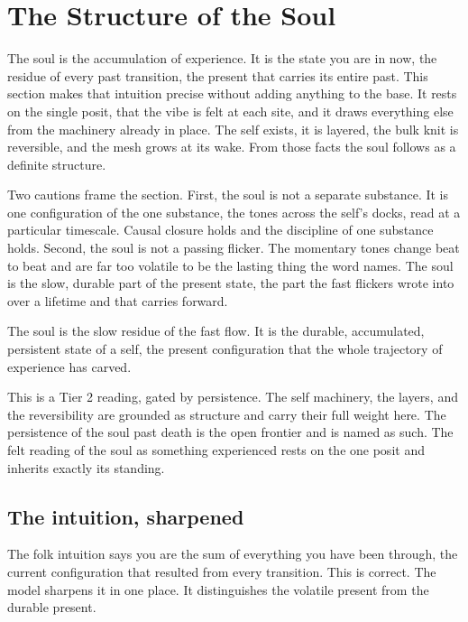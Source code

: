 \section{The Structure of the Soul}

The soul is the accumulation of experience. It is the state you are in now, the residue of every past transition, the present that carries its entire past. This section makes that intuition precise without adding anything to the base. It rests on the single posit, that the vibe is felt at each site, and it draws everything else from the machinery already in place. The self exists, it is layered, the bulk knit is reversible, and the mesh grows at its wake. From those facts the soul follows as a definite structure.

Two cautions frame the section. First, the soul is not a separate substance. It is one configuration of the one substance, the tones across the self's docks, read at a particular timescale. Causal closure holds and the discipline of one substance holds. Second, the soul is not a passing flicker. The momentary tones change beat to beat and are far too volatile to be the lasting thing the word names. The soul is the slow, durable part of the present state, the part the fast flickers wrote into over a lifetime and that carries forward.

\begin{principle}
The soul is the slow residue of the fast flow. It is the durable, accumulated, persistent state of a self, the present configuration that the whole trajectory of experience has carved.
\end{principle}

This is a Tier 2 reading, gated by persistence. The self machinery, the layers, and the reversibility are grounded as structure and carry their full weight here. The persistence of the soul past death is the open frontier and is named as such. The felt reading of the soul as something experienced rests on the one posit and inherits exactly its standing.

\subsection{The intuition, sharpened}

The folk intuition says you are the sum of everything you have been through, the current configuration that resulted from every transition. This is correct. The model sharpens it in one place. It distinguishes the volatile present from the durable present.

